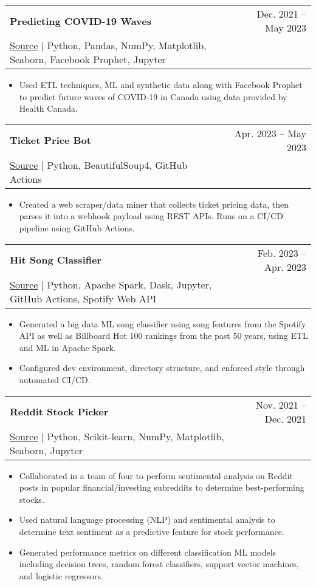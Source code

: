 \documentclass[letterpaper,11pt]{article}
\makeatletter
\newcommand{\resumeItem}[1]{
  \item\small{
    {#1 \vspace{-2pt}}
  }
}
\newcommand{\resumeProjectHeading}[4]{ %
    \item
    \begin{tabular*}{0.97\textwidth}{l@{\extracolsep{\fill}}r}
      \small\textbf{#1} & #2 \\
    \small\href{#3}{{\footnotesize\faGithub} \underline{Source}} $|$ #4 & \\ %
    \end{tabular*}\vspace{-7pt}
}
\newcommand{\resumeItemListStart}{\begin{itemize}}
\newcommand{\resumeItemListEnd}{\end{itemize}\vspace{-5pt}}
\makeatother
\begin{document}
      \resumeProjectHeading
          {Predicting COVID-19 Waves}
          {Dec. 2021 -- May 2023}
          {https://github.com/john-s-lin/can-covid-wave} %
          {Python, Pandas, NumPy, Matplotlib, Seaborn, Facebook Prophet, Jupyter} %
          \resumeItemListStart
            \resumeItem{Used ETL techniques, ML and synthetic data along with Facebook Prophet to predict future waves of COVID-19 in Canada using data provided by Health Canada.}
          \resumeItemListEnd

      \resumeProjectHeading
          {Ticket Price Bot}
          {Apr. 2023 -- May 2023}
          {https://github.com/john-s-lin/ticket-price-bot} %
          {Python, BeautifulSoup4, GitHub Actions} %
          \resumeItemListStart
            \resumeItem{Created a web scraper/data miner that collects ticket pricing data, then parses it into a webhook payload using REST APIs. Runs on a CI/CD pipeline using GitHub Actions.}
          \resumeItemListEnd

      \resumeProjectHeading
          {Hit Song Classifier}
          {Feb. 2023 -- Apr. 2023}
          {https://github.com/john-s-lin/hit-song-classifier} %
          {Python, Apache Spark, Dask, Jupyter, GitHub Actions, Spotify Web API} %
          \resumeItemListStart
            \resumeItem{Generated a big data ML song classifier using song features from the Spotify API as well as Billboard Hot 100 rankings from the past 50 years, using ETL and ML in Apache Spark.}
            \resumeItem{Configured dev environment, directory structure, and enforced style through automated CI/CD.}
          \resumeItemListEnd

      \resumeProjectHeading
          {Reddit Stock Picker}
          {Nov. 2021 -- Dec. 2021}
          {https://github.com/john-s-lin/reddit-stock-picker} %
          {Python, Scikit-learn, NumPy, Matplotlib, Seaborn, Jupyter} %
          \resumeItemListStart
            \resumeItem{Collaborated in a team of four to perform sentimental analysis on Reddit posts in popular financial/investing subreddits to determine best-performing stocks.}
            \resumeItem{Used natural language processing (NLP) and sentimental analysis to determine text sentiment as a predictive feature for stock performance.}
            \resumeItem{Generated performance metrics on different classification ML models including decision trees, random forest classifiers, support vector machines, and logistic regressors.}
          \resumeItemListEnd
\end{document}
